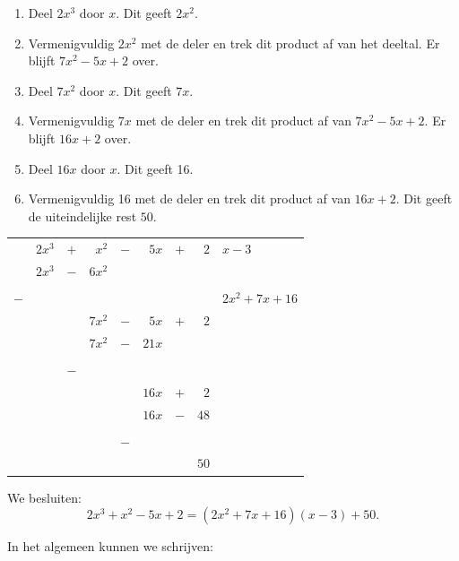 \documentclass{ximera}
\begin{document}
\noindent
\begin{minipage}{.5\textwidth}
\begin{enumerate}
\item Deel $2x^3$ door $x$. Dit geeft $2x^2$.
\item Vermenigvuldig $2x^2$ met de deler en trek dit product af van het deeltal. Er blijft $7x^2-5x+2$ over.
\item Deel $7x^2$ door $x$. Dit geeft $7x$.
\item Vermenigvuldig $7x$ met de deler en trek dit product af van $7x^2-5x+2$. Er blijft $16x+2$ over.
\item Deel $16x$ door $x$. Dit geeft 16.
\item Vermenigvuldig 16 met de deler en trek dit product af van $16x+2$. Dit geeft de uiteindelijke rest $50$.
\end{enumerate}
\end{minipage}
\hspace{.7cm}
\begin{minipage}{.5\textwidth}
\begin{tabular}{r@{\;}r@{\;}c@{\;}r@{\;}c@{\;}r@{\;}c@{\;}r|l}
&$2x^3$&$+$&$x^2$&$-$&$5x$&$+$&$2$&$x-3$\\\cline{9-9}
&$2x^3$&$-$&$6x^2$&&&&&\\\cline{2-4}&&&&&&&&\\[-4.5ex]
$-$\hspace{2pt}&&&&&&&&$2x^2+7x+16$\\
&&&$7x^2$&$-$&$5x$&$+$&$2$&\\
&&&$7x^2$&$-$&$21x$&&&\\\cline{4-6}&&&&&&&&\\[-4.5ex]
&&$-$\hspace{2pt}&&&&\\
&&&&&$16x$&$+$&$2$&\\
&&&&&$16x$&$-$&$48$&\\\cline{6-8}&&&&&&&&\\[-4.5ex]
&&&&$-$\hspace{2pt}&&\\
&&&&&&&$50$&
\end{tabular}

\vspace{1cm}

We besluiten:\[2x^3+x^2-5x+2=(2x^2+7x+16)(x-3)+50.\]
\end{minipage}

In het algemeen kunnen we schrijven:\nopagebreak
\end{document}
